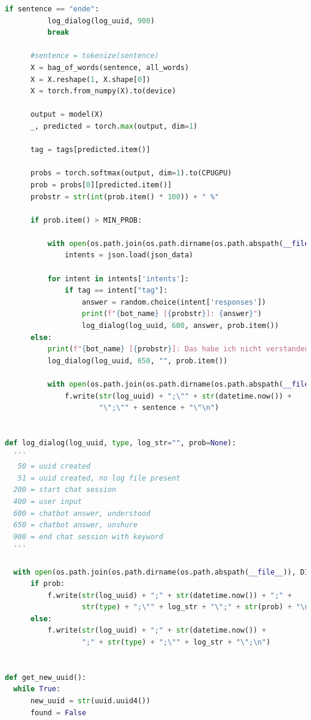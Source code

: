 \documentclass[12pt,oneside,titlepage,listof=totoc,bibliography=totoc]{scrartcl}
\begin{document}
\begin{appendices}
\begin{lstlisting}[language=python]
      if sentence == "ende":
          log_dialog(log_uuid, 900)
          break

      #sentence = tokenize(sentence)
      X = bag_of_words(sentence, all_words)
      X = X.reshape(1, X.shape[0])
      X = torch.from_numpy(X).to(device)

      output = model(X)
      _, predicted = torch.max(output, dim=1)

      tag = tags[predicted.item()]

      probs = torch.softmax(output, dim=1).to(CPUGPU)
      prob = probs[0][predicted.item()]
      probstr = str(int(prob.item() * 100)) + " %"

      if prob.item() > MIN_PROB:

          with open(os.path.join(os.path.dirname(os.path.abspath(__file__)), SRC_FILE), 'r', encoding='utf-8') as json_data:
              intents = json.load(json_data)

          for intent in intents['intents']:
              if tag == intent["tag"]:
                  answer = random.choice(intent['responses'])
                  print(f"{bot_name} [{probstr}]: {answer}")
                  log_dialog(log_uuid, 600, answer, prob.item())
      else:
          print(f"{bot_name} [{probstr}]: Das habe ich nicht verstanden...")
          log_dialog(log_uuid, 650, "", prob.item())

          with open(os.path.join(os.path.dirname(os.path.abspath(__file__)), OPEN_QUESTIONS_FILE), 'a', encoding='utf-8') as f:
              f.write(str(log_uuid) + ";\"" + str(datetime.now()) +
                      "\";\"" + sentence + "\"\n")


def log_dialog(log_uuid, type, log_str="", prob=None):
  '''
   50 = uuid created
   51 = uuid created, no log file present     
  200 = start chat session
  400 = user input
  600 = chatbot answer, understood
  650 = chatbot answer, unshure
  900 = end chat session with keyword
  '''

  with open(os.path.join(os.path.dirname(os.path.abspath(__file__)), DIALOG_LOG_FILE), 'a', encoding='utf-8') as f:
      if prob:
          f.write(str(log_uuid) + ";" + str(datetime.now()) + ";" +
                  str(type) + ";\"" + log_str + "\";" + str(prob) + "\n")
      else:
          f.write(str(log_uuid) + ";" + str(datetime.now()) +
                  ";" + str(type) + ";\"" + log_str + "\";\n")


def get_new_uuid():
  while True:
      new_uuid = str(uuid.uuid4())
      found = False


\end{lstlisting}
\end{appendices}
\end{document}
